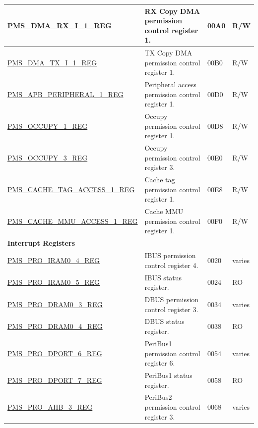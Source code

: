 \begin{longtable}{ |m{6cm} |m{7.2cm} | m{1.3cm} |m{1cm} | }
\hyperref[regdesc:PMSDMARXI1REG]{PMS\_DMA\_RX\_I\_1\_REG} & RX Copy DMA permission control register 1. & \hexprefix{}00A0 & R/W \\ \hline
\hyperref[regdesc:PMSDMATXI1REG]{PMS\_DMA\_TX\_I\_1\_REG} & TX Copy DMA permission control register 1. & \hexprefix{}00B0 & R/W \\ \hline
\hyperref[regdesc:PMSAPBPERIPHERAL1REG]{PMS\_APB\_PERIPHERAL\_1\_REG} & Peripheral access permission control register 1. & \hexprefix{}00D0 & R/W \\ \hline
\hyperref[regdesc:PMSOCCUPY1REG]{PMS\_OCCUPY\_1\_REG} & Occupy permission control register 1. & \hexprefix{}00D8 & R/W \\ \hline

\hyperref[regdesc:PMSOCCUPY3REG]{PMS\_OCCUPY\_3\_REG} & Occupy permission control register 3. & \hexprefix{}00E0 & R/W \\ \hline
\hyperref[regdesc:PMSCACHETAGACCESS1REG]{PMS\_CACHE\_TAG\_ACCESS\_1\_REG} & Cache tag permission control register 1. & \hexprefix{}00E8 & R/W \\ \hline
\hyperref[regdesc:PMSCACHEMMUACCESS1REG]{PMS\_CACHE\_MMU\_ACCESS\_1\_REG} & Cache MMU permission control register 1. & \hexprefix{}00F0 & R/W \\ \hline
\multicolumn{4}{|l|}{\textbf{Interrupt Registers}} \\ \hline
\hyperref[regdesc:PMSPROIRAM04REG]{PMS\_PRO\_IRAM0\_4\_REG} & IBUS permission control register 4. & \hexprefix{}0020 & varies \\ \hline
\hyperref[regdesc:PMSPROIRAM05REG]{PMS\_PRO\_IRAM0\_5\_REG} & IBUS status register. & \hexprefix{}0024 & RO \\ \hline
\hyperref[regdesc:PMSPRODRAM03REG]{PMS\_PRO\_DRAM0\_3\_REG} & DBUS permission control register 3. & \hexprefix{}0034 & varies \\ \hline
\hyperref[regdesc:PMSPRODRAM04REG]{PMS\_PRO\_DRAM0\_4\_REG} & DBUS status register. & \hexprefix{}0038 & RO \\ \hline
\hyperref[regdesc:PMSPRODPORT6REG]{PMS\_PRO\_DPORT\_6\_REG} & PeriBus1 permission control register 6. & \hexprefix{}0054 & varies \\ \hline
\hyperref[regdesc:PMSPRODPORT7REG]{PMS\_PRO\_DPORT\_7\_REG} & PeriBus1 status register. & \hexprefix{}0058 & RO \\ \hline
\hyperref[regdesc:PMSPROAHB3REG]{PMS\_PRO\_AHB\_3\_REG} & PeriBus2 permission control register 3. & \hexprefix{}0068 & varies \\ \hline

\end{longtable}
